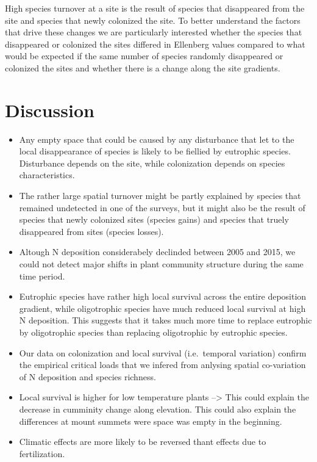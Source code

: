 \documentclass[fleqn,10pt,lineno]{wlpeerj} %
\theoremstyle{definition}
\theoremstyle{definition}
\theoremstyle{definition}
\theoremstyle{remark}
\begin{document}
High species turnover at a site is the result of species that
disappeared from the site and species that newly colonized the site. To
better understand the factors that drive these changes we are
particularly interested whether the species that disappeared or
colonized the sites differed in Ellenberg values compared to what would
be expected if the same number of species randomly disappeared or
colonized the sites and whether there is a change along the site
gradients.

\section*{Discussion}\label{discussion}

\begin{itemize}
\item
  Any empty space that could be caused by any disturbance that let to
  the local disappearance of species is likely to be fiellied by
  eutrophic species. Disturbance depends on the site, while colonization
  depends on species characteristics.
\item
  The rather large spatial turnover might be partly explained by species
  that remained undetected in one of the surveys, but it might also be
  the result of species that newly colonized sites (species gains) and
  species that truely disappeared from sites (species losses).
\item
  Altough N deposition considerabely declinded between 2005 and 2015, we
  could not detect major shifts in plant community structure during the
  same time period.
\item
  Eutrophic species have rather high local survival across the entire
  deposition gradient, while oligotrophic species have much reduced
  local survival at high N deposition. This suggests that it takes much
  more time to replace eutrophic by oligotrophic species than replacing
  oligotrophic by eutrophic species.
\item
  Our data on colonization and local survival (i.e.~temporal variation)
  confirm the empirical critical loads that we infered from anlysing
  spatial co-variation of N deposition and species richness.
\item
  Local survival is higher for low temperature plants --\textgreater{}
  This could explain the decrease in cumminity change along elevation.
  This could also explain the differences at mount summets were space
  was empty in the beginning.
\item
  Climatic effects are more likely to be reversed thant effects due to
  fertilization.
\end{itemize}
\end{document}
